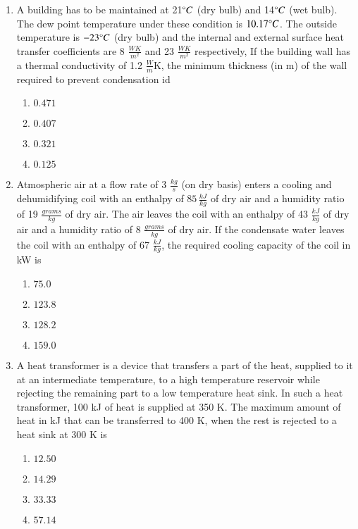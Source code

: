 \documentclass[journal,9pt,onecolumn]{IEEEtran}
\begin{document}
\begin{enumerate}


\item A building has to be maintained at 21$\degree C$ (dry bulb) and 14$\degree C$ (wet bulb). The dew point temperature under these condition is $10.17\degree C$. The outside temperature is $-23\degree C$ (dry bulb) and the internal and external surface heat transfer coefficients are 8 $\frac{WK}{m^2}$ and 23 $\frac{WK}{m^2}$ respectively, If the building wall has a thermal conductivity of 1.2 $\frac{W}{m}$K, the minimum thickness (in m) of the wall required to prevent condensation id
\begin{multicols}{4}
\begin{enumerate}
    \item $0.471$
    \item $0.407$
    \item $0.321$
    \item $0.125$
\end{enumerate}
\end{multicols}

\item Atmospheric air at a flow rate of 3 $\frac{kg}{s}$ (on dry basis) enters a cooling and dehumidifying coil with an enthalpy of $85\, \frac{kJ}{kg}$ of dry air and a humidity ratio of 19 $\frac{grams}{kg}$ of dry air. The air leaves the coil with an enthalpy of 43 $\frac{kJ}{kg}$ of dry air and a humidity ratio of 8 $\frac{grams}{kg}$ of dry air. If the condensate water leaves the coil with an enthalpy of 67 $\frac{kJ}{kg}$, the required cooling capacity of the coil in kW is
\begin{multicols}{4}
\begin{enumerate}
    \item $75.0$
    \item $123.8$
    \item $128.2$
    \item $159.0$
\end{enumerate}
\end{multicols}



\item A heat transformer is a device that transfers a part of the heat, supplied to it at an intermediate temperature, to a high temperature reservoir while rejecting the remaining part to a low temperature heat sink. In such a heat transformer, 100 kJ of heat is supplied at 350 K. The maximum amount of heat in kJ that can be transferred to 400 K, when the rest is rejected to a heat sink at 300 K is
\begin{multicols}{4}
\begin{enumerate}
    \item $12.50$ 
    \item $14.29$ 
    \item $33.33$ 
    \item $57.14$ 
\end{enumerate}
\end{multicols}


\end{enumerate}
\end{document}
